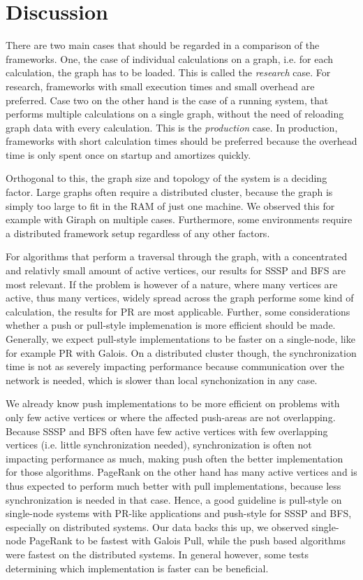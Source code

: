 
\section{Discussion}

There are two main cases that should be regarded in a comparison of the frameworks. One, the case of individual calculations on a graph, i.e. for each calculation, the graph has to be loaded. This is called the \emph{research} case. For research, frameworks with small execution times and small overhead are preferred. Case two on the other hand is the case of a running system, that performs multiple calculations on a single graph, without the need of reloading graph data with every calculation. This is the \emph{production} case.
In production, frameworks with short calculation times should be preferred because the overhead time is only spent once on startup and amortizes quickly.

Orthogonal to this, the graph size and topology of the system is a deciding factor. Large graphs often require a distributed cluster, because the graph is simply too large to fit in the RAM of just one machine. We observed this for example with Giraph on multiple cases.
Furthermore, some environments require a distributed framework setup regardless of any other factors.

For algorithms that perform a traversal through the graph, with a concentrated and relativly small amount of active vertices, our results for SSSP and BFS are most relevant.
If the problem is however of a nature, where many vertices are active, thus many vertices, widely spread across the graph performe some kind of calculation, the results for PR are most applicable.
Further, some considerations whether a push or pull-style implemenation is more efficient should be made.
Generally, we expect pull-style implementations to be faster on a single-node, like for example PR with Galois.
On a distributed cluster though, the synchronization time is not as severely impacting performance because communication over the network is needed, which is slower than local synchonization in any case.

We already know push implementations to be more efficient on problems with only few active vertices or where the affected push-areas are not overlapping. 
Because SSSP and BFS often have few active vertices with few overlapping vertices (i.e. little synchronization needed), synchronization is often not impacting performance as much, making push often the better implementation for those algorithms.
PageRank on the other hand has many active vertices and is thus expected to perform much better with pull implementations, because less synchronization is needed in that case.
Hence, a good guideline is pull-style on single-node systems with PR-like applications and push-style for SSSP and BFS, especially on distributed systems. 
Our data backs this up, we observed single-node PageRank to be fastest with Galois Pull, while the push based algorithms were fastest on the distributed systems.
In general however, some tests determining which implementation is faster can be beneficial.

